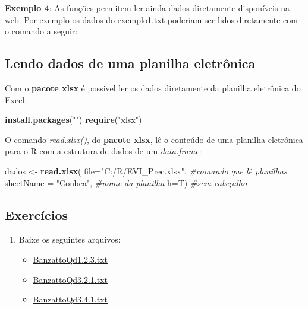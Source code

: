 \documentclass[
]{book}
\newenvironment{Shaded}{\begin{snugshade}}{\end{snugshade}}
\newcommand{\CommentTok}[1]{\textcolor[rgb]{0.56,0.35,0.01}{\textit{#1}}}
\newcommand{\DataTypeTok}[1]{\textcolor[rgb]{0.13,0.29,0.53}{#1}}
\newcommand{\KeywordTok}[1]{\textcolor[rgb]{0.13,0.29,0.53}{\textbf{#1}}}
\newcommand{\NormalTok}[1]{#1}
\newcommand{\StringTok}[1]{\textcolor[rgb]{0.31,0.60,0.02}{#1}}
\providecommand{\tightlist}{%
  \setlength{\itemsep}{0pt}\setlength{\parskip}{0pt}}
\begin{document}
\textbf{Exemplo 4}: As funções permitem ler ainda dados diretamente disponíveis na web. Por exemplo os dados do \href{https://www.dropbox.com/s/m7jivbbggei5y0x/exemplo1.txt?dl=1}{exemplo1.txt} poderiam ser lidos diretamente com o comando a seguir:

\hypertarget{lendo-dados-de-uma-planilha-eletruxf4nica}{%
\subsection{Lendo dados de uma planilha eletrônica}\label{lendo-dados-de-uma-planilha-eletruxf4nica}}

Com o \textbf{pacote xlsx} é possivel ler os dados diretamente da planilha eletrônica do Excel.

\begin{Shaded}
\begin{Highlighting}[]
\KeywordTok{install.packages}\NormalTok{(}\StringTok{""}\NormalTok{)}
\KeywordTok{require}\NormalTok{(}\StringTok{"xlsx"}\NormalTok{)}
\end{Highlighting}
\end{Shaded}

O comando \emph{read.xlsx()}, do \textbf{pacote xlsx}, lê o conteúdo de uma planilha eletrônica para o R com a estrutura de dados de um \emph{data.frame}:

\begin{Shaded}
\begin{Highlighting}[]
\NormalTok{dados <-}\StringTok{ }\KeywordTok{read.xlsx}\NormalTok{(}
                    \DataTypeTok{file=}\StringTok{"C:/R/EVI_Prec.xlsx"}\NormalTok{,     }\CommentTok{#comando que lê planilhas}
                    \DataTypeTok{sheetName =} \StringTok{"Conbea"}\NormalTok{,          }\CommentTok{#nome da planilha}
                    \DataTypeTok{h=}\NormalTok{T)                           }\CommentTok{#sem cabeçalho  }
\end{Highlighting}
\end{Shaded}

\hypertarget{exercuxedcios}{%
\subsection{Exercícios}\label{exercuxedcios}}

\begin{enumerate}
\def\labelenumi{\arabic{enumi}.}
\tightlist
\item
  Baixe os seguintes arquivos:

  \begin{itemize}
  \tightlist
  \item
    \href{https://www.dropbox.com/s/uq1n2sv8an2eoan/BanzattoQd1.2.3.txt?dl=1}{BanzattoQd1.2.3.txt}
  \item
    \href{https://www.dropbox.com/s/jjyo8dhyy0qt3ft/BanzattoQd3.2.1.txt?dl=1}{BanzattoQd3.2.1.txt}
  \item
    \href{https://www.dropbox.com/s/yv5clm6qljurzbw/BanzattoQd3.4.1.txt?dl=1}{BanzattoQd3.4.1.txt}
  \end{itemize}
\end{enumerate}
\end{document}
